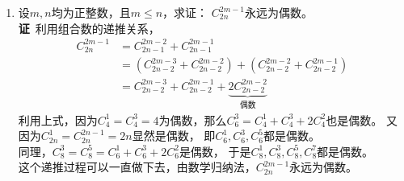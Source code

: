 \begin{enumerate}[label={【\textbf{例\thechapter.\arabic*}】},
 leftmargin=\inteval{\myenumleftmargin}pt,
 itemsep=\inteval{\myenumitempsep}pt,
 itemindent=\inteval{\myenumitemindent}pt]
\item \label{C_2n^1357都是偶数} 
设$m,n$均为正整数，且$m\leq n$，求证：
$ C_{2n}^{2m-1} $永远为偶数。\\
\textbf{证}\ 利用组合数的递推关系，
\begin{align*}
    C_{2n}^{2m-1} &=C_{2n-1}^{2m-2}+C_{2n-1}^{2m-1}  \\
    &=(C_{2n-2}^{2m-3}+C_{2n-2}^{2m-2})+(C_{2n-2}^{2m-2}+C_{2n-2}^{2m-1}) \\
    &=C_{2n-2}^{2m-3}+C_{2n-2}^{2m-1}+
    \underbrace{2C_{2n-2}^{2m-2}}_{\text{偶数}} 
\end{align*}
利用上式，因为$C_4^1=C_4^3=4$为偶数，那么$C_6^3=C_4^1+C_4^3+2C_4^2$也是偶数。
又因为$ C_{2n}^1=C_{2n}^{2n-1}=2n $显然是偶数，
即$C_6^1,C_6^3,C_6^5$都是偶数。\\
同理，$ C_8^3=C_8^5=C_6^1+C_6^3+2C_6^2 $是偶数，
于是$C_8^1,C_8^3,C_8^5,C_8^7$都是偶数。\\
这个递推过程可以一直做下去，由数学归纳法，$ C_{2n}^{2m-1} $永远为偶数。


\end{enumerate}
